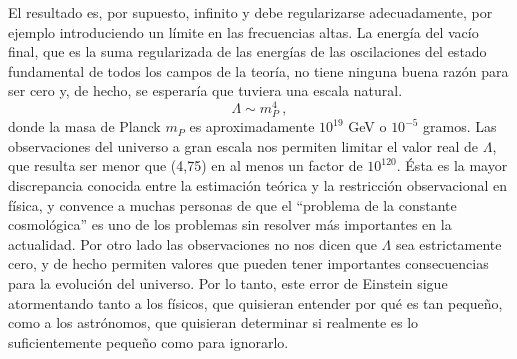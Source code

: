 \documentclass[11pt,b5paper,openany,twoside]{book}
\begin{document}
El resultado es, por supuesto, infinito y debe regularizarse adecuadamente, por ejemplo introduciendo un límite en las frecuencias altas.
La energía del vacío final, que es la suma regularizada de las energías de las oscilaciones del estado fundamental de todos los campos de la teoría, no tiene ninguna buena razón para ser cero y, de hecho, se esperaría que tuviera una escala natural.
\begin{equation}
\Lambda \sim m_P^4\ ,\label{4.75}
\end{equation}
donde la masa de Planck $m_P$ es aproximadamente $10^{19}$ GeV o $10^{-5}$ gramos.
Las observaciones del universo a gran escala nos permiten limitar el valor real de $\Lambda$, que resulta ser menor que (4,75) en al menos un factor de $10^{120}$.
Ésta es la mayor discrepancia conocida entre la estimación teórica y la restricción observacional en física, y convence a muchas personas de que el ``problema de la constante cosmológica'' es uno de los problemas sin resolver más importantes en la actualidad.
Por otro lado las observaciones no nos dicen que $\Lambda$ sea estrictamente cero, y de hecho permiten valores que pueden tener importantes consecuencias para la evolución del universo.
Por lo tanto, este error de Einstein sigue atormentando tanto a los físicos, que quisieran entender por qué es tan pequeño, como a los astrónomos, que quisieran determinar si realmente es lo suficientemente pequeño como para ignorarlo.
\end{document}
